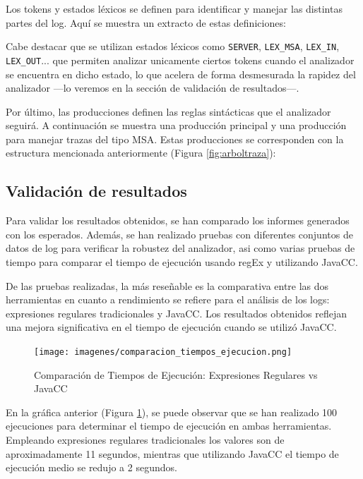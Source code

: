 \lstset{inputencoding=utf8/latin1}


Los tokens y estados léxicos se definen para identificar y manejar las distintas partes del log. Aquí se muestra un extracto de estas definiciones:

\lstset{inputencoding=utf8/latin1}


Cabe destacar que se utilizan estados léxicos como \lstinline|SERVER|, \lstinline|LEX_MSA|, \lstinline|LEX_IN|, \lstinline|LEX_OUT|... que permiten analizar unicamente ciertos tokens cuando el analizador se encuentra en dicho estado, lo que acelera de forma desmesurada la rapidez del analizador ---lo veremos en la sección de validación de resultados---.

Por último, las producciones definen las reglas sintácticas que el analizador seguirá. A continuación se muestra una producción principal y una producción para manejar trazas del tipo MSA. Estas producciones se corresponden con la estructura mencionada anteriormente (Figura \ref{fig:arboltraza}):

\lstset{inputencoding=utf8/latin1}


\subsection{Validación de resultados}

\noindent Para validar los resultados obtenidos, se han comparado los informes generados con los esperados. Además, se han realizado pruebas con diferentes conjuntos de datos de log para verificar la robustez del analizador, asi como varias pruebas de tiempo para comparar el tiempo de ejecución usando regEx y utilizando JavaCC. 

De las pruebas realizadas, la más reseñable es la comparativa entre las dos herramientas en cuanto a rendimiento se refiere para el análisis de los logs: expresiones regulares tradicionales y JavaCC. Los resultados obtenidos reflejan una mejora significativa en el tiempo de ejecución cuando se utilizó JavaCC.

\begin{figure}[H]
\centering
\texttt{[image: imagenes/comparacion\_tiempos\_ejecucion.png]}
\caption{Comparación de Tiempos de Ejecución: Expresiones Regulares vs JavaCC}
\label{fig:comparacion_tiempos_ejecucion.png}
\end{figure}

\noindent En la gráfica anterior (Figura \ref{fig:comparacion_tiempos_ejecucion.png}), se puede observar que se han realizado 100 ejecuciones para determinar el tiempo de ejecución en ambas herramientas. Empleando expresiones regulares tradicionales los valores son de aproximadamente 11 segundos, mientras que utilizando JavaCC el tiempo de ejecución medio se redujo a 2 segundos.

